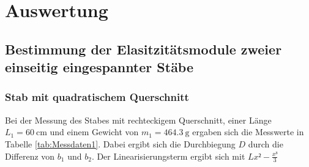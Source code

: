 \section{Auswertung}
\label{sec:Auswertung}

\subsection{Bestimmung der Elasitzitätsmodule zweier einseitig eingespannter Stäbe}

\subsubsection{Stab mit quadratischem Querschnitt}

Bei der Messung des Stabes mit rechteckigem Querschnitt, einer Länge 
$L_1= \SI{60}{\centi\meter}$ und einem Gewicht von $m_1 = \SI{464.3}{\gram}$
ergaben sich die Messwerte in Tabelle \ref{tab:Messdaten1}. Dabei ergibt sich 
die Durchbiegung $D$ durch die Differenz von $b_1$ und $b_2$. Der 
Linearisierungsterm ergibt sich mit $Lx²-\frac{x³}{3}$

